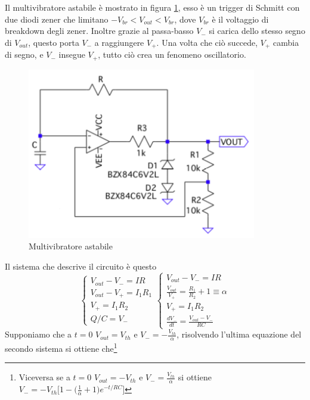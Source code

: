 \documentclass{article}
\begin{document}
		Il multivibratore astabile è mostrato in figura \ref{fig:multivibratore}, esso è un trigger di Schmitt con due diodi zener che limitano $-V_{br}<V_{out}<V_{br}$, dove $V_{br}$ è il voltaggio di breakdown degli zener. Inoltre grazie al passa-basso $V_-$ si carica dello stesso segno di $V_{out}$, questo porta $V_-$ a raggiungere $V_+$.\newline
		Una volta che ciò succede, $V_+$ cambia di segno, e $V_-$ insegue $V_+$, tutto ciò crea un fenomeno oscillatorio.\newline
		\begin{figure}
			\centering
			\includegraphics[width=100mm]{immagini/multivibratore.png}
			\caption{Multivibratore astabile}
			\label{fig:multivibratore}
		\end{figure}
		Il sistema che descrive il circuito è questo
		\begin{equation}
			\begin{cases}
				V_{out}-V_-=IR\\
				V_{out}-V_+=I_1R_1\\
				V_+=I_1R_2\\
				Q/C=V_-
			\end{cases}
			\begin{cases}
				V_{out}-V_-=IR\\
				\frac{V_{out}}{V_+}=\frac{R_1}{R_2}+1\equiv \alpha\\
				V_+=I_1R_2\\
				\frac{dV_-}{dt}=\frac{V_{out}-V_-}{RC}
			\end{cases}
		\end{equation}
		Supponiamo che a $t=0$ $V_{out}=V_{th}$ e $V_-=-\frac{V_{th}}{\alpha}$, risolvendo l'ultima equazione del secondo sistema si ottiene che\footnote{Viceversa se a $t=0$ $V_{out}=-V_{th}$ e $V_-=\frac{V_{th}}{\alpha}$ si ottiene $V_-=-V_{th}\bigg[1-\bigg(\frac{1}{\alpha}+1\bigg)e^{-t/RC}\bigg]$}
\end{document}
